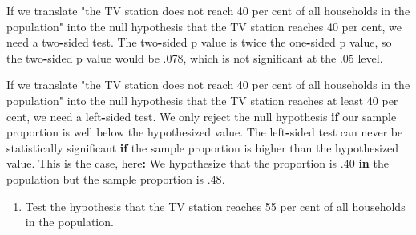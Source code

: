 \documentclass[a4paper]{book}
\newenvironment{Shaded}{\begin{snugshade}}{\end{snugshade}}
\newcommand{\DecValTok}[1]{\textcolor[rgb]{0.00,0.00,0.00}{#1}}
\newcommand{\StringTok}[1]{\textcolor[rgb]{0.00,0.00,0.00}{#1}}
\newcommand{\ControlFlowTok}[1]{\textcolor[rgb]{0.00,0.00,0.00}{\textbf{#1}}}
\newcommand{\OperatorTok}[1]{\textcolor[rgb]{0.00,0.00,0.00}{\textbf{#1}}}
\newcommand{\NormalTok}[1]{#1}
\providecommand{\tightlist}{%
  \setlength{\itemsep}{0pt}\setlength{\parskip}{0pt}}
\theoremstyle{definition}
\theoremstyle{definition}
\theoremstyle{definition}
\theoremstyle{remark}
\begin{document}
\begin{Shaded}
\begin{Highlighting}[]
\NormalTok{If we translate }\StringTok{"the TV station does not reach 40 per cent of all households in}
\StringTok{the population"}\NormalTok{ into the null hypothesis that the TV station reaches }\DecValTok{40}\NormalTok{ per}
\NormalTok{cent, we need a two}\OperatorTok{-}\NormalTok{sided test. The two}\OperatorTok{-}\NormalTok{sided p value is twice the one}\OperatorTok{-}\NormalTok{sided p}
\NormalTok{value, so the two}\OperatorTok{-}\NormalTok{sided p value would be .}\DecValTok{078}\NormalTok{, which is not significant at the}
\NormalTok{.}\DecValTok{05}\NormalTok{ level.}

\NormalTok{If we translate }\StringTok{"the TV station does not reach 40 per cent of all households in}
\StringTok{the population"}\NormalTok{ into the null hypothesis that the TV station reaches at least}
\DecValTok{40}\NormalTok{ per cent, we need a left}\OperatorTok{-}\NormalTok{sided test. We only reject the null hypothesis }\ControlFlowTok{if}
\NormalTok{our sample proportion is well below the hypothesized value. The left}\OperatorTok{-}\NormalTok{sided test}
\NormalTok{can never be statistically significant }\ControlFlowTok{if}\NormalTok{ the sample proportion is higher than}
\NormalTok{the hypothesized value. This is the case, here}\OperatorTok{:}\StringTok{ }\NormalTok{We hypothesize that the}
\NormalTok{proportion is .}\DecValTok{40} \ControlFlowTok{in}\NormalTok{ the population but the sample proportion is .}\DecValTok{48}\NormalTok{.}
\end{Highlighting}
\end{Shaded}

\begin{enumerate}
\def\labelenumi{\arabic{enumi}.}
\setcounter{enumi}{1}
\tightlist
\item
  Test the hypothesis that the TV station reaches 55 per cent of all
  households in the population.
\end{enumerate}
\end{document}
